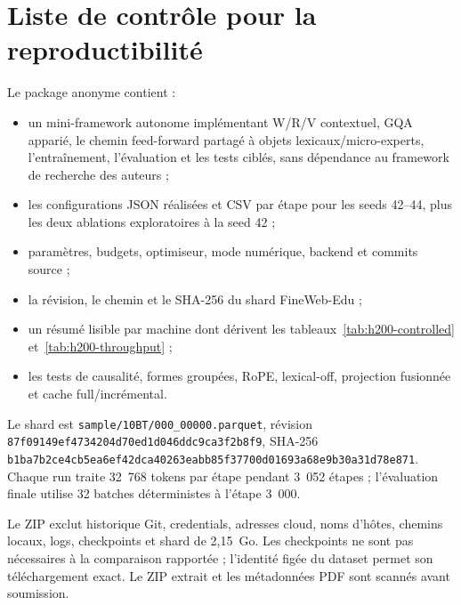 \section{Liste de contrôle pour la reproductibilité}

Le package anonyme contient :
\begin{itemize}
    \item un mini-framework autonome implémentant W/R/V contextuel, GQA apparié, le chemin feed-forward partagé à objets lexicaux/micro-experts, l'entraînement, l'évaluation et les tests ciblés, sans dépendance au framework de recherche des auteurs ;
    \item les configurations JSON réalisées et CSV par étape pour les seeds 42--44, plus les deux ablations exploratoires à la seed 42 ;
    \item paramètres, budgets, optimiseur, mode numérique, backend et commits source ;
    \item la révision, le chemin et le SHA-256 du shard FineWeb-Edu ;
    \item un résumé lisible par machine dont dérivent les tableaux~\ref{tab:h200-controlled} et~\ref{tab:h200-throughput} ;
    \item les tests de causalité, formes groupées, RoPE, lexical-off, projection fusionnée et cache full/incrémental.
\end{itemize}

Le shard est \texttt{sample/10BT/000\_00000.parquet}, révision \texttt{87f09149ef4734204d70ed1d046ddc9ca3f2b8f9}, SHA-256 \texttt{b1ba7b2ce4cb5ea6ef42dca40263eabb85f37700d01693a68e9b30a31d78e871}. Chaque run traite 32~768 tokens par étape pendant 3~052 étapes ; l'évaluation finale utilise 32 batches déterministes à l'étape 3~000.

Le ZIP exclut historique Git, credentials, adresses cloud, noms d'hôtes, chemins locaux, logs, checkpoints et shard de 2,15~Go. Les checkpoints ne sont pas nécessaires à la comparaison rapportée ; l'identité figée du dataset permet son téléchargement exact. Le ZIP extrait et les métadonnées PDF sont scannés avant soumission.